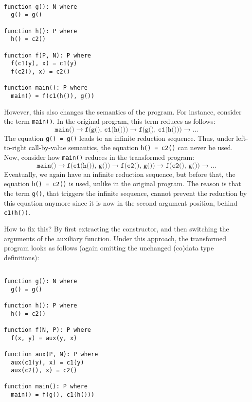 \begin{lstlisting}

function g(): N where
  g() = g()

function h(): P where
  h() = c2()

function f(P, N): P where
  f(c1(y), x) = c1(y)
  f(c2(), x) = c2()

function main(): P where
  main() = f(c1(h()), g())

\end{lstlisting}

However, this also changes the semantics of the program. For instance, consider the term \texttt{main()}. In the original program, this term reduces as follows:
\[
\texttt{main()} \longrightarrow \texttt{f(g(), c1(h()))} \longrightarrow \texttt{f(g(), c1(h()))} \longrightarrow ...
\]
The equation \texttt{g() = g()} leads to an infinite reduction sequence. Thus, under left-to-right call-by-value semantics, the equation \texttt{h() = c2()} can never be used. Now, consider how \texttt{main()} reduces in the transformed program:
\[
\texttt{main()} \longrightarrow \texttt{f(c1(h()), g())} \longrightarrow \texttt{f(c2(), g())} \longrightarrow \texttt{f(c2(), g())} \longrightarrow ...
\]
Eventually, we again have an infinite reduction sequence, but before that, the equation \texttt{h() = c2()} is used, unlike in the original program. The reason is that the term \texttt{g()}, that triggers the infinite sequence, cannot prevent the reduction by this equation anymore since it is now in the second argument position, behind \texttt{c1(h())}.

How to fix this? By first extracting the constructor, and then switching the arguments of the auxiliary function. Under this approach, the transformed program looks as follows (again omitting the unchanged (co)data type definitions):

\begin{lstlisting}

function g(): N where
  g() = g()

function h(): P where
  h() = c2()

function f(N, P): P where
  f(x, y) = aux(y, x)

function aux(P, N): P where
  aux(c1(y), x) = c1(y)
  aux(c2(), x) = c2()

function main(): P where
  main() = f(g(), c1(h()))

\end{lstlisting}

